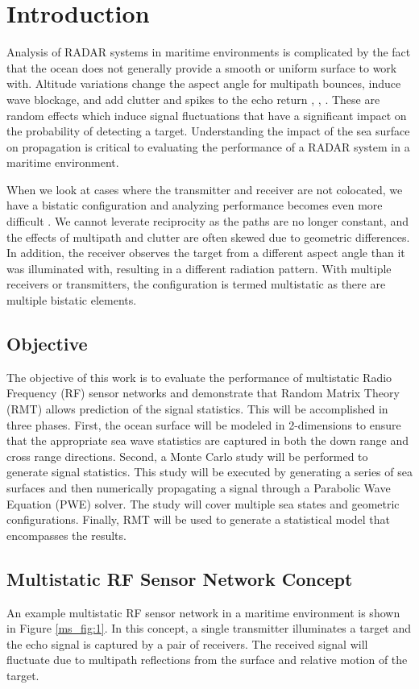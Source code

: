 \chapter{Introduction}
Analysis of RADAR systems in maritime environments is complicated by the fact that the ocean does not generally provide a smooth or uniform surface to work with. Altitude variations change the aspect angle for multipath bounces, induce wave blockage, and add clutter and spikes to the echo return \cite{skolnik_handbook}, \cite{blake_radar}, \cite{nathanson_radar}. These are random effects which induce signal fluctuations that have a significant impact on the probability of detecting a target. Understanding the impact of the sea surface on propagation is critical to evaluating the performance of a RADAR system in a maritime environment.

When we look at cases where the transmitter and receiver are not colocated, we have a bistatic configuration and analyzing performance becomes even more difficult \cite{willis_bistatic}. We cannot leverate reciprocity as the paths are no longer constant, and the effects of multipath and clutter are often skewed due to geometric differences.  In addition, the receiver observes the target from a different aspect angle than it was illuminated with, resulting in a different radiation pattern. With multiple receivers or transmitters, the configuration is termed multistatic as there are multiple bistatic elements.

\section{Objective}
The objective of this work is to evaluate the performance of multistatic Radio Frequency (RF) sensor networks and demonstrate that Random Matrix Theory (RMT) allows prediction of the signal statistics. This will be accomplished in three phases. First, the ocean surface will be modeled in 2-dimensions to ensure that the appropriate sea wave statistics are captured in both the down range and cross range directions. Second, a Monte Carlo study will be performed to generate signal statistics. This study will be executed by generating a series of sea surfaces and then numerically propagating a signal through a Parabolic Wave Equation (PWE) solver. The study will cover multiple sea states and geometric configurations. Finally, RMT will be used to generate a statistical model that encompasses the results.

\section{Multistatic RF Sensor Network Concept}
An example multistatic RF sensor network in a maritime environment is shown in Figure \ref{ms_fig:1}. In this concept, a single transmitter illuminates a target and the echo signal is captured by a pair of receivers. The received signal will fluctuate due to multipath reflections from the surface and relative motion of the target.

